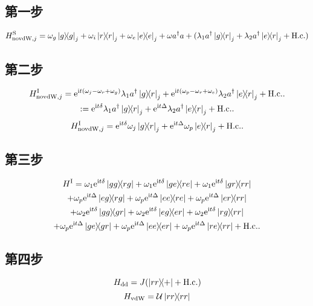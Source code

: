 \documentclass[
fontsetup = font-setup-open.tex,
titlesetup = titles-setup.tex
]{AJbook}
\numberwithin{equation}{section}
\begin{document}
\subsection{第一步}
\begin{equation}\label{key}
H_{\mathrm{novdW},j}^\mathrm{S}=\omega_g\ketbra{g}{g}_j+\omega_i\ketbra{r}{r}_j+\omega_e\ketbra{e}{e}_j+\omega a^\dagger a+(\lambda_1a^\dagger\ketbra{g}{r}_j+\lambda_2a^\dagger\ketbra{e}{r}_j+\mathrm{H.c.})
\end{equation}
\subsection{第二步}
\begin{multline}
H_{\mathrm{novdW},j}^\mathrm{I}=\mathrm{e}^{\mathrm{i}t(\omega_j-\omega_r+\omega_g)}\lambda_1 a^\dagger\ketbra{g}{r}_j+\mathrm{e}^{\mathrm{i}t(\omega_p-\omega_r+\omega_e)}\lambda_2 a^\dagger\ketbra{e}{r}_j+\mathrm{H.c.}.
\\:=\mathrm{e}^{\mathrm{i}t\delta}\lambda_1 a^\dagger\ketbra{g}{r}_j+\mathrm{e}^{\mathrm{i}t\Delta}\lambda_2 a^\dagger\ketbra{e}{r}_j+\mathrm{H.c.}.
\end{multline}
\begin{equation}
H_{\mathrm{novdW},j}^\mathrm{I}=\mathrm{e}^{\mathrm{i}t\delta}\omega_j\ketbra{g}{r}_j+\mathrm{e}^{\mathrm{i}t\Delta}\omega_p\ketbra{e}{r}_j+\mathrm{H.c.}.
\end{equation}
\subsection{第三步}
\begin{multline}
H^\mathrm{I}
=\omega_1\mathrm{e}^{\mathrm{i}t\delta}\ketbra{gg}{rg}
+\omega_1\mathrm{e}^{\mathrm{i}t\delta}\ketbra{ge}{re}
+\omega_1\mathrm{e}^{\mathrm{i}t\delta}\ketbra{gr}{rr}\\
+\omega_p\mathrm{e}^{\mathrm{i}t\Delta}\ketbra{eg}{rg}
+\omega_p\mathrm{e}^{\mathrm{i}t\Delta}\ketbra{ee}{re}
+\omega_p\mathrm{e}^{\mathrm{i}t\Delta}\ketbra{er}{rr}\\
+\omega_2\mathrm{e}^{\mathrm{i}t\delta}\ketbra{gg}{gr}
+\omega_2\mathrm{e}^{\mathrm{i}t\delta}\ketbra{eg}{er}
+\omega_2\mathrm{e}^{\mathrm{i}t\delta}\ketbra{rg}{rr}\\
+\omega_p\mathrm{e}^{\mathrm{i}t\Delta}\ketbra{ge}{gr}
+\omega_p\mathrm{e}^{\mathrm{i}t\Delta}\ketbra{ee}{er}
+\omega_p\mathrm{e}^{\mathrm{i}t\Delta}\ketbra{re}{rr}
+\mathrm{H.c.}.
\end{multline}
\subsection{第四步}
\begin{equation}\label{key}
H_{\mathrm{dd}}=J(\ketbra{rr}{+}+\mathrm{H.c.})
\end{equation}
\begin{equation}\label{key}
H_{\mathrm{vdW}}=\mathcal{U}\ketbra{rr}{rr}
\end{equation}
\end{document}
